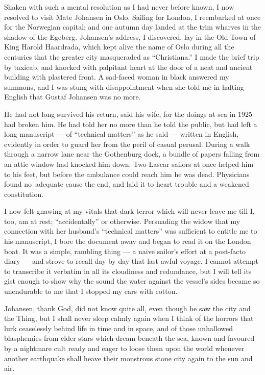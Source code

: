 Shaken with such a mental resolution as I had never before known, I now
resolved to visit Mate Johansen in Oslo. Sailing for London, I
reembarked at once for the Norwegian capital; and one autumn day landed
at the trim wharves in the shadow of the Egeberg. Johansen's address, I
discovered, lay in the Old Town of King Harold Haardrada, which kept
alive the name of Oslo during all the centuries that the greater city
masqueraded as ``Christiana.'' I made the brief trip by taxicab, and
knocked with palpitant heart at the door of a neat and ancient building
with plastered front. A sad-faced woman in black answered my summons,
and I was stung with disappointment when she told me in halting English
that Gustaf Johansen was no more.

He had not long survived his return, said his wife, for the doings at
sea in 1925 had broken him. He had told her no more than he told the
public, but had left a long manuscript --- of ``technical matters'' as he
said --- written in English, evidently in order to guard her from the
peril of casual perusal. During a walk through a narrow lane near the
Gothenburg dock, a bundle of papers falling from an attic window had
knocked him down. Two Lascar sailors at once helped him to his feet, but
before the ambulance could reach him he was dead. Physicians found no\est\
adequate cause the end, and laid it to heart trouble and a weakened
constitution.

I now felt gnawing at my vitals that dark terror which
will never leave me till I, too, am at rest; ``accidentally'' or
otherwise. Persuading the widow that my connection with her husband's
``technical matters'' was sufficient to entitle me to his manuscript, I
bore the document away and began to read it on the London boat.
It was a simple, rambling thing --- a naive sailor's effort at a
post-facto diary --- and strove to recall day by day that last awful
voyage. I cannot attempt to transcribe it verbatim in all its cloudiness
and redundance, but I will tell its gist enough to show why the sound
the water against the vessel's sides became so unendurable to me that I
stopped my ears with cotton.

Johansen, thank God, did not know quite all, even though he saw the city
and the Thing, but I shall never sleep calmly again when I think of the
horrors that lurk ceaselessly behind life in time and in space, and of
those unhallowed blasphemies from elder stars which dream beneath the
sea, known and favoured by a nightmare cult ready and eager to loose
them upon the world whenever another earthquake shall heave their
monstrous stone city again to the sun and air.


